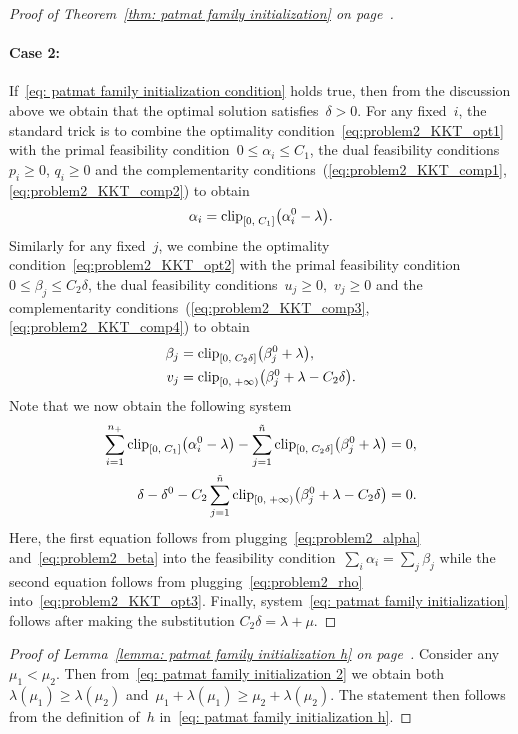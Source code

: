 \begin{proof}[Proof of Theorem~\ref{thm: patmat family initialization} on page~\pageref{thm: patmat family initialization}]
  \paragraph*{Case 2:} If~\eqref{eq: patmat family initialization condition} holds true, then from the discussion above we obtain that the optimal solution satisfies~$\delta > 0$. For any fixed~$i$, the standard trick is to combine the optimality condition~\eqref{eq:problem2_KKT_opt1} with the primal feasibility condition~$0 \le \alpha_i \le C_1$, the dual feasibility conditions~$p_i \ge 0$, $q_i \ge 0$ and the complementarity conditions~(\ref{eq:problem2_KKT_comp1}, \ref{eq:problem2_KKT_comp2}) to obtain
  \begin{equation}\label{eq:problem2_alpha}
    \alpha_i = \clip{0}{C_1}{\alpha_i^0 - \lambda}.
  \end{equation}
  Similarly for any fixed~$j$, we combine the optimality condition~\eqref{eq:problem2_KKT_opt2} with the primal feasibility condition~$0 \le \beta_j \le C_2 \delta$, the dual feasibility conditions~$u_j \ge 0,$ $v_j \ge 0$ and the complementarity conditions~(\ref{eq:problem2_KKT_comp3}, \ref{eq:problem2_KKT_comp4}) to obtain
  \begin{align}
    \beta_j & = \clip{0}{C_2 \delta}{\beta_j^0 + \lambda}, \label{eq:problem2_beta} \\
    v_j & = \clip[u]{0}{+\infty}{\beta_j^0 + \lambda - C_2 \delta}. \label{eq:problem2_rho}
  \end{align}
  Note that we now obtain the following system
  \begin{align*}
    \sum_{i=1}^{\npos} \clip{0}{C_1}{\alpha_i^0 - \lambda} - \sum_{j = 1}^{\ntil} \clip{0}{C_2 \delta}{\beta_j^0 + \lambda}
      & = 0, \\
    \delta - \delta^0 - C_2 \sum_{j = 1}^{\ntil} \clip[u]{0}{+\infty}{\beta_j^0 + \lambda - C_2 \delta}
      & = 0.
  \end{align*}
  Here, the first equation follows from plugging~\eqref{eq:problem2_alpha} and~\eqref{eq:problem2_beta} into the feasibility condition~$\sum_i \alpha_i =\sum_j \beta_j$ while the second equation follows from plugging~\eqref{eq:problem2_rho} into~\eqref{eq:problem2_KKT_opt3}. Finally, system~\eqref{eq: patmat family initialization} follows after making the substitution $C_2 \delta = \lambda + \mu$.
\end{proof}

\patinith*
\begin{proof}[Proof of Lemma~\ref{lemma: patmat family initialization h} on page~\pageref{lemma: patmat family initialization h}]
  Consider any~$\mu_1 < \mu_2$. Then from~\eqref{eq: patmat family initialization 2} we obtain both~$\lambda(\mu_1) \ge \lambda(\mu_2)$ and~$\mu_1+\lambda(\mu_1) \ge \mu_2 + \lambda(\mu_2)$. The statement then follows from the definition of~$h$ in~\eqref{eq: patmat family initialization h}.
\end{proof}
